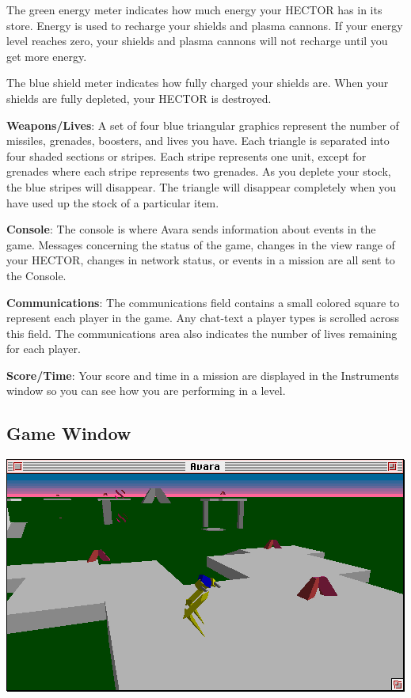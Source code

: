 \documentclass{article}
\begin{document}
The green energy meter indicates how much energy your HECTOR has in its store. Energy is used to recharge your shields and plasma cannons. If your energy level reaches zero, your shields and plasma cannons will not recharge until you get more energy.

The blue shield meter indicates how fully charged your shields are. When your shields are fully depleted, your HECTOR is destroyed.

\textbf{Weapons/Lives}: A set of four blue triangular graphics represent the number of missiles, grenades, boosters, and lives you have. Each triangle is separated into four shaded sections or stripes. Each stripe represents one unit, except for grenades where each stripe represents two grenades. As you deplete your stock, the blue stripes will disappear. The triangle will disappear completely when you have used up the stock of a particular item.

\textbf{Console}: The console is where Avara sends information about events in the game. Messages concerning the status of the game, changes in the view range of your HECTOR, changes in network status, or events in a mission are all sent to the Console.

\textbf{Communications}: The communications field contains a small colored square to represent each player in the game. Any chat-text a player types is scrolled across this field. The communications area also indicates the number of lives remaining for each player.

\textbf{Score/Time}: Your score and time in a mission are displayed in the Instruments window so you can see how you are performing in a level.

\subsection{Game Window}
\begin{center}
	\includegraphics[width=\textwidth]{img/03.png}
\end{center}
\end{document}
